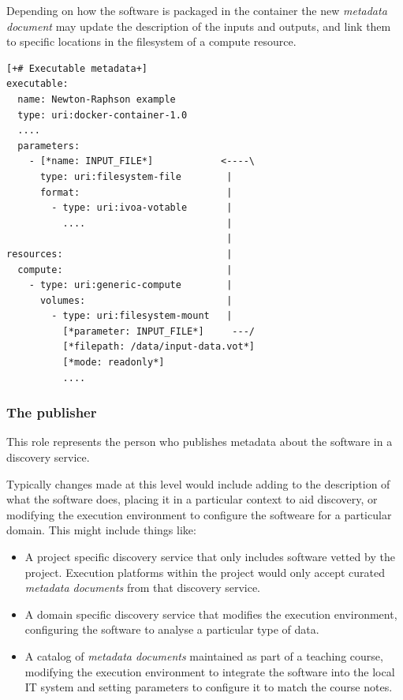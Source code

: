 \documentclass[11pt,a4paper]{ivoa}
\newcommand{\metadoc} [1]{\textit{metadata document#1}}
\begin{document}
Depending on how the software is packaged in the container the
new \metadoc{} may update the description of the inputs and outputs,
and link them to specific locations in the filesystem of a compute
resource.

\begin{lstlisting}[]
[+# Executable metadata+]
executable:
  name: Newton-Raphson example
  type: uri:docker-container-1.0
  ....
  parameters:
    - [*name: INPUT_FILE*]            <----\
      type: uri:filesystem-file        |
      format:                          |
        - type: uri:ivoa-votable       |
          ....                         |
                                       |
resources:                             |
  compute:                             |
    - type: uri:generic-compute        |
      volumes:                         |
        - type: uri:filesystem-mount   |
          [*parameter: INPUT_FILE*]     ---/
          [*filepath: /data/input-data.vot*]
          [*mode: readonly*]
          ....
\end{lstlisting}

\subsubsection{The publisher}
\label{subsub-metadata-publisher}

This role represents the person who publishes metadata about the software in a discovery service.

Typically changes made at this level would include adding to the description
of what the software does, placing it in a particular context to aid discovery,
or modifying the execution environment to configure the softweare for a particular domain.
This might include things like:

\begin{itemize}
    \item A project specific discovery service that only includes software vetted by the project.
          Execution platforms within the project would only accept curated \metadoc{s}
          from that discovery service.
    \item A domain specific discovery service that modifies the execution environment, configuring
          the software to analyse a particular type of data.
    \item A catalog of \metadoc{s} maintained as part of a teaching course, modifying the
          execution environment to integrate the software into the local IT system and setting
          parameters to configure it to match the course notes.
\end{itemize}
\end{document}
